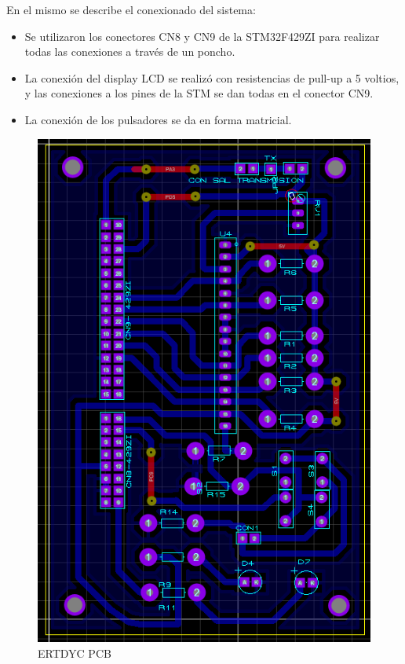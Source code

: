 \documentclass[conference]{IEEEtran}
\begin{document}
En el mismo se describe el conexionado del sistema:

\begin{itemize}
\item Se utilizaron los conectores CN8 y CN9 de la STM32F429ZI para realizar todas las conexiones a través de un poncho.
\item La conexión del display LCD se realizó con resistencias de pull-up a 5 voltios, y las conexiones a los pines de la STM se dan todas en el conector CN9.
\item La conexión de los pulsadores se da en forma matricial.
\end{itemize}

\begin{figure}[htbp]
\centering
\includegraphics[width=.9\linewidth]{../../images/estacionPCB.png}
\caption{\label{fig:estacionPCB}ERTDYC PCB}
\end{figure}
\end{document}
